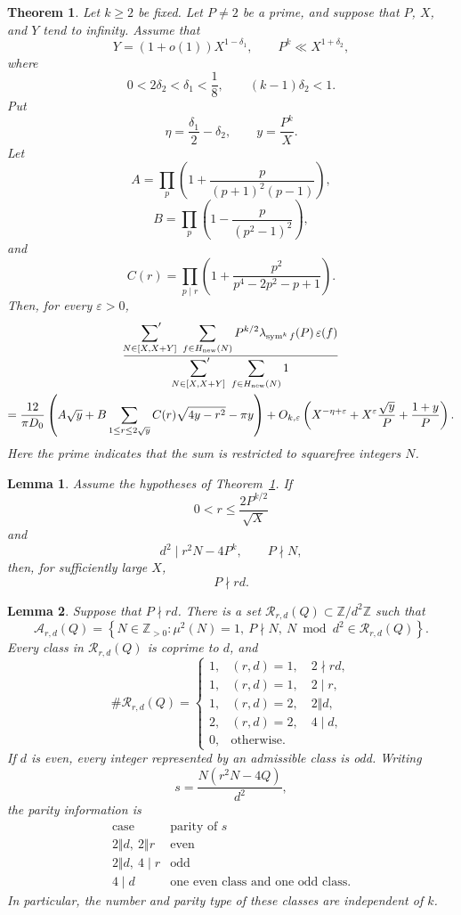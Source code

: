 \documentclass[10pt,a4paper]{amsart}
\newtheorem{theorem}{Theorem}
\newtheorem{lemma}{Lemma}
\newcommand{\sym}{\operatorname{sym}}
\begin{document}
\begin{theorem}\label{thm:scaled-murmuration}
Let $k\geq 2$ be fixed.  Let $P\neq 2$ be a prime, and suppose that $P$, $X$, and $Y$ tend to infinity.
Assume that
\[
Y=(1+o(1))X^{1-\delta_1},
\qquad
P^k\ll X^{1+\delta_2},
\]
where
\[
0<2\delta_2<\delta_1<\frac18,
\qquad
(k-1)\delta_2<1.
\]
Put
\[
\eta=\frac{\delta_1}{2}-\delta_2,
\qquad
y=\frac{P^k}{X}.
\]
Let
\[
A=\prod_p\left(1+\frac{p}{(p+1)^2(p-1)}\right),
\]
\[
B=\prod_p\left(1-\frac{p}{(p^2-1)^2}\right),
\]
and
\[
C(r)=\prod_{p\mid r}
\left(1+\frac{p^2}{p^4-2p^2-p+1}\right).
\]
Then, for every $\varepsilon>0$,
\begin{multline*}
\frac{
\displaystyle
\sideset{}{'}\sum_{N\in[X,X+Y]}
\ \sum_{f\in H_{\mathrm{new}}(N)}
P^{k/2}\lambda_{\sym^k f}(P)\,\varepsilon(f)
}{
\displaystyle
\sideset{}{'}\sum_{N\in[X,X+Y]}
\ \sum_{f\in H_{\mathrm{new}}(N)}1
}
\\
=
\frac{12}{\pi D_0}
\left(
A\sqrt y
+
B\sum_{1\leq r\leq 2\sqrt y}
C(r)\sqrt{4y-r^2}
-\pi y
\right)
+
O_{k,\varepsilon}\left(
X^{-\eta+\varepsilon}
+X^\varepsilon\frac{\sqrt y}{P}
+\frac{1+y}{P}
\right).
\end{multline*}
Here the prime indicates that the sum is restricted to squarefree integers $N$.
\end{theorem}

\begin{lemma}\label{lem:p-coprime}
Assume the hypotheses of Theorem~\ref{thm:scaled-murmuration}.
If
\[
0<r\leq\frac{2P^{k/2}}{\sqrt X}
\]
and
\[
d^2\mid r^2N-4P^k,
\qquad
P\nmid N,
\]
then, for sufficiently large $X$,
\[
P\nmid rd.
\]
\end{lemma}

\begin{lemma}\label{lem:admissible-classes}
Suppose that $P\nmid rd$.  There is a set
$\mathcal R_{r,d}(Q)\subset\mathbb Z/d^2\mathbb Z$ such that
\[
\mathcal A_{r,d}(Q)
=
\left\{
N\in\mathbb Z_{>0}:
\mu^2(N)=1,\ P\nmid N,\
N\bmod d^2\in\mathcal R_{r,d}(Q)
\right\}.
\]
Every class in $\mathcal R_{r,d}(Q)$ is coprime to $d$, and
\[
\#\mathcal R_{r,d}(Q)
=
\begin{cases}
1,&(r,d)=1,\quad 2\nmid rd,\\
1,&(r,d)=1,\quad 2\mid r,\\
1,&(r,d)=2,\quad 2\Vert d,\\
2,&(r,d)=2,\quad 4\mid d,\\
0,&\text{otherwise}.
\end{cases}
\]
If $d$ is even, every integer represented by an admissible class is odd.
Writing
\[
s=\frac{N(r^2N-4Q)}{d^2},
\]
the parity information is
\[
\begin{array}{c|c}
\text{case}&\text{parity of }s\\ \hline
2\Vert d,\ 2\Vert r&\text{even}\\
2\Vert d,\ 4\mid r&\text{odd}\\
4\mid d&\text{one even class and one odd class}.
\end{array}
\]
In particular, the number and parity type of these classes are independent of $k$.
\end{lemma}
\end{document}

